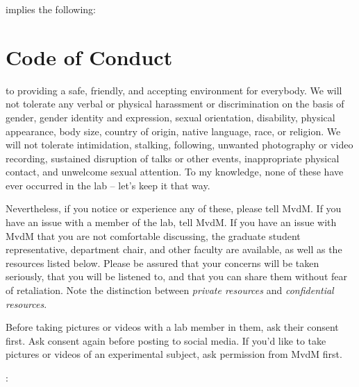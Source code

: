 \documentclass{tufte-book}
\begin{document}
 implies the following:

\section{Code of Conduct}

 to providing a safe, friendly, and
accepting environment for everybody. We will not tolerate any verbal
or physical harassment or discrimination on the basis of gender,
gender identity and expression, sexual orientation, disability,
physical appearance, body size, country of origin, native language,
race, or religion. We will not tolerate intimidation, stalking,
following, unwanted photography or video recording, sustained
disruption of talks or other events, inappropriate physical contact,
and unwelcome sexual attention. To my knowledge, none of these have
ever occurred in the lab -- let's keep it that way.

Nevertheless, if you notice or experience any of these, please tell
MvdM. If you have an issue with a member of the lab, tell MvdM. If you
have an issue with MvdM that you are not comfortable discussing, the
graduate student representative, department chair, and other faculty
are available, as well as the resources listed below. Please be
assured that your concerns will be taken seriously, that you will be
listened to, and that you can share them without fear of
retaliation. Note the distinction between {\it private resources} and
{\it confidential resources}.

Before taking pictures or videos with a lab member in them, ask their
consent first. Ask consent again before posting to social media. If
you'd like to take pictures or videos of an experimental subject, ask
permission from MvdM first.

:
\end{document}
